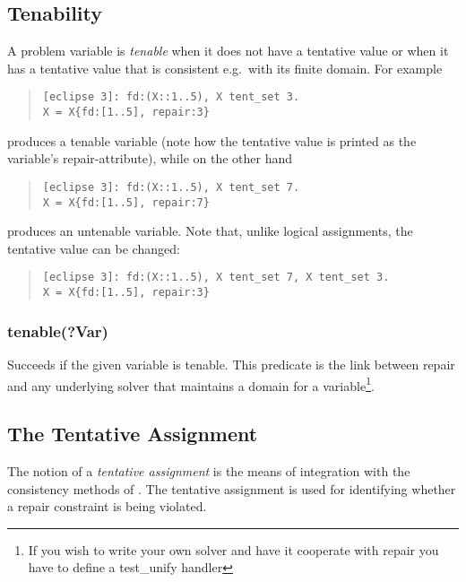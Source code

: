 \subsection{Tenability}
A problem variable is {\em tenable} when it does not have a 
tentative value or when it has a tentative value that is
consistent e.g.\ with its finite domain. For example
\begin{quote}\begin{verbatim}
[eclipse 3]: fd:(X::1..5), X tent_set 3.
X = X{fd:[1..5], repair:3}
\end{verbatim}\end{quote}
produces a tenable variable (note how the tentative value is printed
as the variable's repair-attribute), while on the other hand
\begin{quote}\begin{verbatim}
[eclipse 3]: fd:(X::1..5), X tent_set 7.
X = X{fd:[1..5], repair:7}
\end{verbatim}\end{quote}
produces an untenable variable. Note that, unlike logical assignments,
the tentative value can be changed:
\begin{quote}\begin{verbatim}
[eclipse 3]: fd:(X::1..5), X tent_set 7, X tent_set 3.
X = X{fd:[1..5], repair:3}
\end{verbatim}\end{quote}

\subsubsection{tenable(?Var)}
Succeeds if the given variable is tenable. This predicate is the link
between repair and any underlying solver that maintains a domain for
a variable\footnote{
If you wish to write your own solver and have it cooperate with repair
you have to define a test_unify handler}.


\subsection{The Tentative Assignment}
The notion of a {\em tentative assignment} is the means of integration
with the consistency methods of {\eclipse}.  The tentative assignment
is used for identifying whether a repair constraint is being violated.

